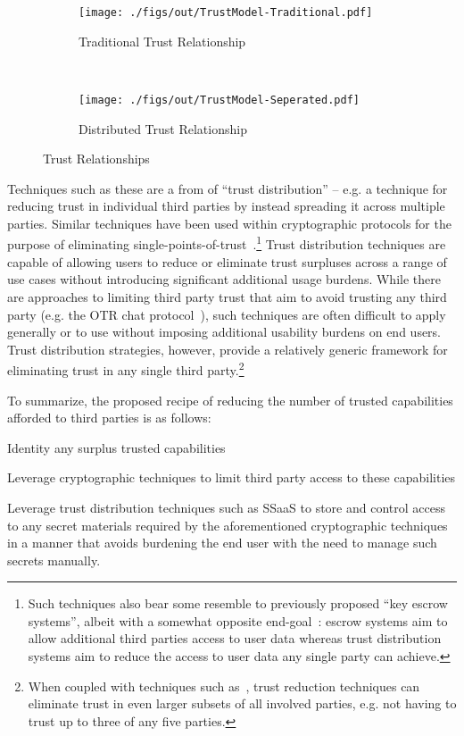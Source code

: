 \begin{figure}[t]
  \centering
  \begin{subfigure}[t]{0.48\textwidth}
    \centering
    \texttt{[image: ./figs/out/TrustModel-Traditional.pdf]}
    \caption{Traditional Trust Relationship}
    \label{fig:mitigation:trust:traditional}
  \end{subfigure}
  ~
  \begin{subfigure}[t]{0.48\textwidth}
    \centering
    \texttt{[image: ./figs/out/TrustModel-Seperated.pdf]}
    \caption{Distributed Trust Relationship}
    \label{fig:mitigation:trust:distributed}
  \end{subfigure}
  \caption{Trust Relationships}
  \label{fig:mitigation:trust}
\end{figure}

Techniques such as these are a from of ``trust distribution'' --
e.g. a technique for reducing trust in individual third parties by
instead spreading it across multiple parties. Similar techniques have
been used within cryptographic protocols for the purpose of
eliminating single-points-of-trust~\cite{shamir1979}.\footnote{Such
  techniques also bear some resemble to previously proposed ``key
  escrow systems'', albeit with a somewhat opposite
  end-goal~\cite{denning1996}: escrow systems aim to allow additional
  third parties access to user data whereas trust distribution systems
  aim to reduce the access to user data any single party can achieve.}
Trust distribution techniques are capable of allowing users to reduce
or eliminate trust surpluses across a range of use cases without
introducing significant additional usage burdens. While there are
approaches to limiting third party trust that aim to avoid trusting
any third party (e.g. the OTR chat protocol~\cite{otr-v3}), such
techniques are often difficult to apply generally or to use without
imposing additional usability burdens on end users. Trust distribution
strategies, however, provide a relatively generic framework for
eliminating trust in any single third party.\footnote{When coupled
  with techniques such as~\cite{shamir1979}, trust reduction
  techniques can eliminate trust in even larger subsets of all
  involved parties, e.g. not having to trust up to three of any five
  parties.}

To summarize, the proposed recipe of reducing the number of trusted
capabilities afforded to third parties is as follows:

\begin{packed_enum}
\item Identity any surplus trusted capabilities
\item Leverage cryptographic techniques to limit third party access to
  these capabilities
\item Leverage trust distribution techniques such as SSaaS to store
  and control access to any secret materials required by the
  aforementioned cryptographic techniques in a manner that avoids
  burdening the end user with the need to manage such secrets
  manually.
\end{packed_enum}

